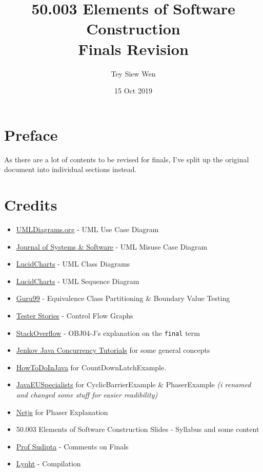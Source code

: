 \documentclass[a4paper]{article}
\title{50.003 Elements of Software Construction\\Finals Revision}
\author{Tey Siew Wen}
\date{15 Oct 2019}
\begin{document}
	
\maketitle

\section*{Preface}
As there are a lot of contents to be revised for finals, I've split up
the original document into individual sections instead.

\section*{Credits}
\begin{itemize}
	\item \href{https://www.uml-diagrams.org/use-case-diagrams.html}{UMLDiagrams.org} - UML Use Case Diagram
	\item \href{https://www.sciencedirect.com/science/article/pii/S0164121213002458}{Journal
		of Systems \& Software} - UML Misuse Case Diagram
	\item  \href{https://www.lucidchart.com/pages/uml-class-diagram}{LucidCharts} - UML Class Diagrams
	\item  \href{https://www.youtube.com/watch?v=pCK6prSq8aw}{LucidCharts} - UML Sequence Diagram
	\item  \href{https://www.guru99.com/equivalence-partitioning-boundary-value-analysis.html}{Guru99} - Equivalence Class Partitioning \& Boundary Value Testing
	\item \href{http://testerstories.com/2014/06/path-testing-the-coverage/}{Tester
		Stories} - Control Flow Graphs
	\item \href{https://stackoverflow.com/questions/22351222/can-we-change-the-value-of-a-final-variable-of-a-mutable-class}{StackOverflow}
	- OBJ04-J's explanation on the \texttt{final} term
	\item \href{http://tutorials.jenkov.com/java-concurrency/index.html}{Jenkov
		Java Concurrency Tutorials} for some general concepts
	\item \href{https://howtodoinjava.com/java/multi-threading/best-practices-for-using-concurrenthashmap/}{HowToDoInJava}
	for CountDownLatchExample.
	\item \href{https://www.javaspecialists.eu/archive/Issue257.html}{JavaEUSpecialists}
	for CyclicBarrierExample \& PhaserExample \emph{(i renamed and changed
		some stuff for easier readibility)}
	\item \href{https://netjs.blogspot.com/2016/01/phaser-in-java-concurrency.html}{Netjs}
	for Phaser Explanation
	\item 50.003 Elements of Software Construction Slides
	- Syllabus and some content
	\item \href{https://istd.sutd.edu.sg/people/faculty/sudipta-chattopadhyay}{Prof
		Sudipta} - Comments on Finals
	\item \href{https://github.com/lyqht}{Lyqht} -
	Compilation
	
\end{itemize}
\end{document}

